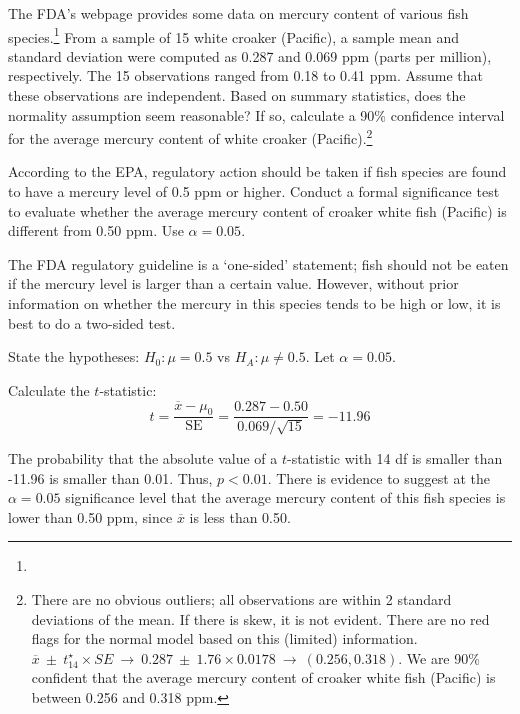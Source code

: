 
\begin{exercise} \label{croakerWhiteFishPacificExerConditions}
The FDA's webpage provides some data on mercury content of various fish species.\footnote{} From a sample of 15 white croaker (Pacific), a sample mean and standard deviation were computed as 0.287 and 0.069 ppm (parts per million), respectively. The 15 observations ranged from 0.18 to 0.41 ppm. Assume that these observations are independent. Based on summary statistics, does the normality assumption seem reasonable? If so, calculate a 90\% confidence interval for the average mercury content of white croaker (Pacific).\footnote{There are no obvious outliers; all observations are within 2 standard deviations of the mean. If there is skew, it is not evident. There are no red flags for the normal model based on this (limited) information. $\overline{x} \ \pm\ t^{\star}_{14} \times SE \ \to\  0.287 \ \pm\  1.76\times 0.0178\ \to\ (0.256, 0.318)$. We are 90\% confident that the average mercury content of croaker white fish (Pacific) is between 0.256 and 0.318 ppm.}
\end{exercise}

\begin{example}{According to the EPA, regulatory action should be taken if fish species are found to have a mercury level of 0.5 ppm or higher. Conduct a formal significance test to evaluate whether the average mercury content of croaker white fish (Pacific) is different from 0.50 ppm. Use $\alpha = 0.05$. 
}

The FDA regulatory guideline is a `one-sided' statement; fish should not be eaten if the mercury level is larger than a certain value. However, without prior information on whether the mercury in this species tends to be high or low, it is best to do a two-sided test.

State the hypotheses: $H_0: \mu = 0.5$ vs $H_A: \mu \neq 0.5$. Let $\alpha = 0.05$.

Calculate the $t$-statistic: 
\[t = \frac{\overline{x} - \mu_0}{\text{SE}} = \frac{0.287 - 0.50}{0.069/\sqrt{15}} = -11.96\]

The probability that the absolute value of a $t$-statistic with 14 df is smaller than -11.96 is smaller than 0.01. Thus, $p < 0.01$. There is evidence to suggest at the $\alpha = 0.05$ significance level that the average mercury content of this fish species is lower than 0.50 ppm, since $\overline{x}$ is less than 0.50.

\end{example}	

